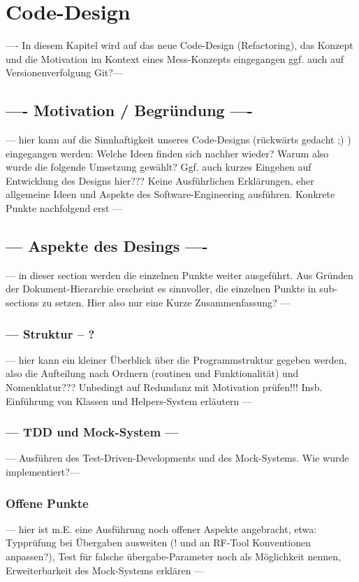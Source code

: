 \documentclass[../Report.tex]{subfiles}
\begin{document}
\chapter{Code-Design}
\label{chap:code}
---- In diesem Kapitel wird auf das neue Code-Design (Refactoring), das Konzept und die Motivation im Kontext eines Mess-Konzepts eingegangen ggf. auch auf Versionenverfolgung Git?--- 

\section{---- Motivation / Begründung ----}
\label{sec:code.mot}
--- hier kann auf die Sinnhaftigkeit unseres Code-Designs (rückwärts gedacht ;) ) eingegangen werden: Welche Ideen finden sich nachher wieder? Warum also wurde die folgende Umsetzung gewählt? Ggf. auch kurzes Eingehen auf Entwicklung des Designs hier??? Keine Ausführlichen Erklärungen, eher allgemeine Ideen und Aspekte des Software-Engineering ausführen. Konkrete Punkte nachfolgend erst ---


\section{ --- Aspekte des Desings ---- }
\label{sec:code.asp}
--- in dieser section werden die einzelnen Punkte weiter ausgeführt. Aus Gründen der Dokument-Hierarchie erscheint es sinnvoller, die einzelnen Punkte in sub-sections zu setzen. Hier also nur eine Kurze Zusammenfassung? --- 

\subsection{--- Struktur -- ?}
\label{subsec:code.asp.struc}
--- hier kann ein kleiner Überblick über die Programmstruktur gegeben werden, also die Aufteilung nach Ordnern (routinen und Funktionalität) und Nomenklatur??? Unbedingt auf Redundanz mit Motivation prüfen!!! Insb. Einführung von Klassen und Helpers-System erläutern
---

\subsection{--- TDD und Mock-System --- }
\label{subsec:code.asp.tdd}
--- Ausführen des Test-Driven-Developments und des Mock-Systems. Wie wurde implementiert?---

\subsection{Offene Punkte}
\label{subsec:code.asp.open}
--- hier ist m.E. eine Ausführung noch offener Aspekte angebracht, etwa: Typprüfung bei Übergaben ausweiten (! und an RF-Tool Konventionen anpassen?), Test für falsche übergabe-Parameter noch als Möglichkeit nennen, Erweiterbarkeit des Mock-Systems erklären --- 
\end{document}
